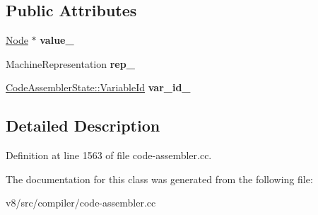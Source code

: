 \subsection*{Public Attributes}
\begin{DoxyCompactItemize}
\item 
\mbox{\label{classv8_1_1internal_1_1compiler_1_1CodeAssemblerVariable_1_1Impl_aa337acb9fee6825f95893c49dc2e5832}} 
\mbox{\hyperlink{classv8_1_1internal_1_1compiler_1_1Node}{Node}} $\ast$ {\bfseries value\+\_\+}
\item 
\mbox{\label{classv8_1_1internal_1_1compiler_1_1CodeAssemblerVariable_1_1Impl_a4259def416d3b88ac18ba268f3a973d0}} 
Machine\+Representation {\bfseries rep\+\_\+}
\item 
\mbox{\label{classv8_1_1internal_1_1compiler_1_1CodeAssemblerVariable_1_1Impl_ae095fd3067c2ea42304677af8f503382}} 
\mbox{\hyperlink{classuint32__t}{Code\+Assembler\+State\+::\+Variable\+Id}} {\bfseries var\+\_\+id\+\_\+}
\end{DoxyCompactItemize}


\subsection{Detailed Description}


Definition at line 1563 of file code-\/assembler.\+cc.



The documentation for this class was generated from the following file\+:\begin{DoxyCompactItemize}
\item 
v8/src/compiler/code-\/assembler.\+cc\end{DoxyCompactItemize}
